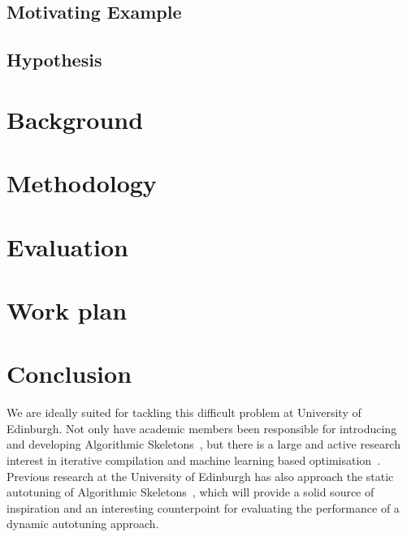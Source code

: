 \subsection{Motivating Example}
\subsection{Hypothesis}
\section{Background}
\section{Methodology}
\section{Evaluation}
\section{Work plan}

\section{Conclusion}
We are ideally suited for tackling this difficult problem at
University of Edinburgh. Not only have academic members been
responsible for introducing and developing Algorithmic
Skeletons~\cite{Cole1989, Cole2004, Benoit2005a}, but there is a large
and active research interest in iterative compilation and machine
learning based optimisation~\cite{Fursin2008, Agakov,
Fursin2005}. Previous research at the University of Edinburgh has also
approach the static autotuning of Algorithmic
Skeletons~\cite{Collins2012, Collins2013}, which will provide a solid
source of inspiration and an interesting counterpoint for evaluating
the performance of a dynamic autotuning approach.



